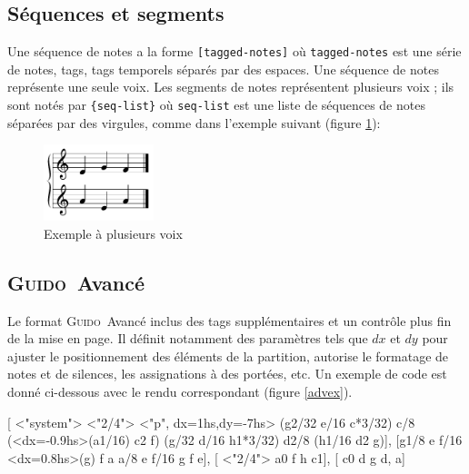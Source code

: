 \documentclass{article}
\newenvironment{gmncode}		{\vspace{-2mm}\small\verbatim}{\endverbatim\vspace{-2mm}}
\newcommand{\Guido}		{\textsc{Guido}}
\newcommand{\code}[1]		{{\small \texttt{#1}}}
\newcommand{\codeindent}	{\\ \hspace*{9mm}}
\begin{document}
\subsection{Séquences et segments}
Une séquence de notes a la forme \verb+[tagged-notes]+ où \code{tagged-notes} est une série de notes, tags, tags temporels séparés par des espaces. Une séquence de notes représente une seule voix.
Les segments de notes représentent plusieurs voix ; ils sont notés par \verb+{seq-list}+ où \code{seq-list} est une liste de séquences de notes séparées par des virgules, comme dans l'exemple suivant (figure \ref{fig:voices}):
\codeindent\code{ \{ [ e g f ], [ a e a ] \} }
\begin{figure}[h]
	\centering \includegraphics[width=32mm]{rsrc/voices}
 \caption{Exemple à plusieurs voix}
 \label{fig:voices}
\end{figure}


\subsection{\Guido\ Avancé}
Le format \Guido\ Avancé inclus des tags supplémentaires et un contrôle plus fin de la mise en page.
Il définit notamment des paramètres tels que $dx$ et $dy$ pour ajuster le positionnement des éléments de la partition, autorise le formatage de notes et de silences, les assignations à des portées, etc.
Un exemple de code est donné ci-dessous avec le rendu correspondant (figure \ref{advex}).

\begin{gmncode} 
{
 [
  \barFormat<"system">
   \stemsUp \meter<"2/4"> 
  \intens<"p", dx=1hs,dy=-7hs>
  \beam(g2/32 e/16 c*3/32) c/8 
  \beam(\noteFormat<dx=-0.9hs>(a1/16) c2 f) 
  \beam(g/32 d/16 h1*3/32) d2/8 
  \beam(h1/16 d2 g)],
 [\stemsDown g1/8 e
  f/16 \noteFormat<dx=0.8hs>(g) f a a/8 e 
  f/16 g f e],
 [ \meter<"2/4"> 
  \stemsUp a0 f h c1],
 [ \stemsDown c0 d g {d, a}]
}
\end{gmncode} 
\end{document}
